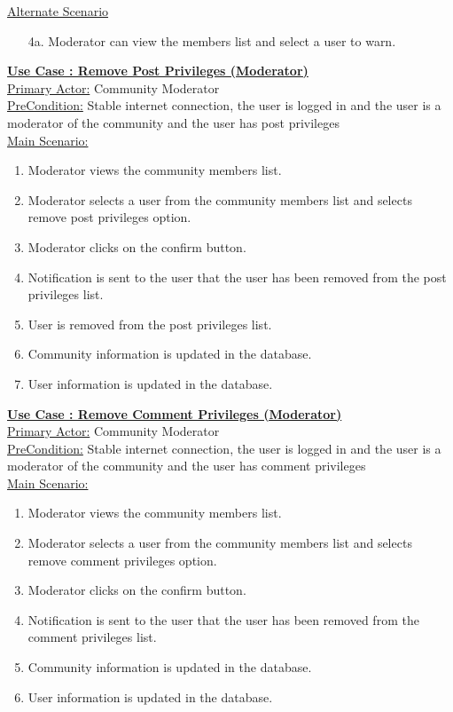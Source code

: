 \documentclass[conference,compsoc]{IEEEtran}
\newcounter{UC}
\newcommand{\nextU}{\stepcounter{UC}\theUC}
\begin{document}
\underline{Alternate Scenario}\\
\begin{enumerate}
    \item [4a.] Moderator can view the members list and select a user to warn.
\end{enumerate}

\underline{\textbf{Use Case \nextU: Remove Post Privileges (Moderator)}}\\

\underline{Primary Actor:} Community Moderator\\

\underline{PreCondition:} Stable internet connection, the user is logged in and the user is a moderator of the community and the user has post privileges\\

\underline{Main Scenario:}\\

\begin{enumerate}
    \item Moderator views the community members list.
    \item Moderator selects a user from the community members list and selects remove post privileges option.
    \item Moderator clicks on the confirm button.
    \item Notification is sent to the user that the user has been removed from the post privileges list.
    \item User is removed from the post privileges list.
    \item Community information is updated in the database.
    \item User information is updated in the database.
\end{enumerate}

\underline{\textbf{Use Case \nextU: Remove Comment Privileges (Moderator)}}\\

\underline{Primary Actor:} Community Moderator\\

\underline{PreCondition:} Stable internet connection, the user is logged in and the user is a moderator of the community and the user has comment privileges\\

\underline{Main Scenario:}\\
\begin{enumerate}
    \item Moderator views the community members list.
    \item Moderator selects a user from the community members list and selects remove comment privileges option.
    \item Moderator clicks on the confirm button.
    \item Notification is sent to the user that the user has been removed from the comment privileges list.
    \item Community information is updated in the database.
    \item User information is updated in the database.
\end{enumerate}
\end{document}
